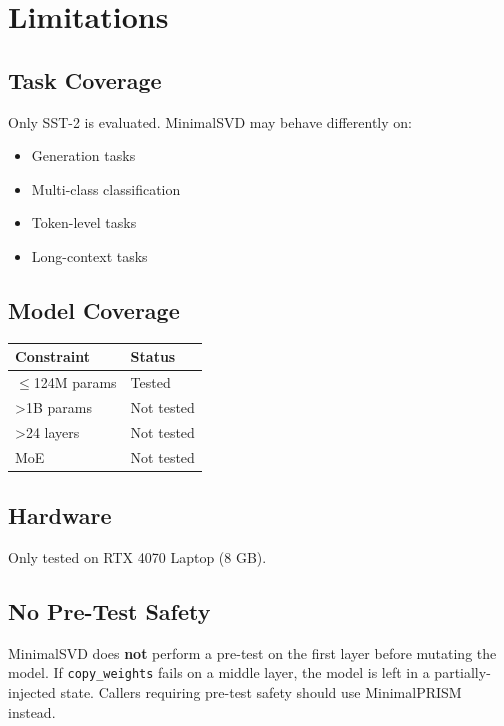
\section{Limitations}

\subsection{Task Coverage}

Only SST-2 is evaluated. MinimalSVD may behave differently on:
\begin{itemize}
\item Generation tasks
\item Multi-class classification
\item Token-level tasks
\item Long-context tasks

\end{itemize}
\subsection{Model Coverage}

\begin{table}[H]
\centering
\small
\begin{tabular}{ll}
\toprule
\textbf{Constraint} & \textbf{Status} \\
\midrule
$\le$124M params & Tested \\
>1B params & Not tested \\
>24 layers & Not tested \\
MoE & Not tested \\
\bottomrule
\end{tabular}
\end{table}

\subsection{Hardware}

Only tested on RTX 4070 Laptop (8 GB).

\subsection{No Pre-Test Safety}

MinimalSVD does \textbf{not} perform a pre-test on the first layer before mutating 
the model. If \texttt{copy\_weights} fails on a middle layer, the model is left in a 
partially-injected state. Callers requiring pre-test safety should use 
MinimalPRISM instead.

